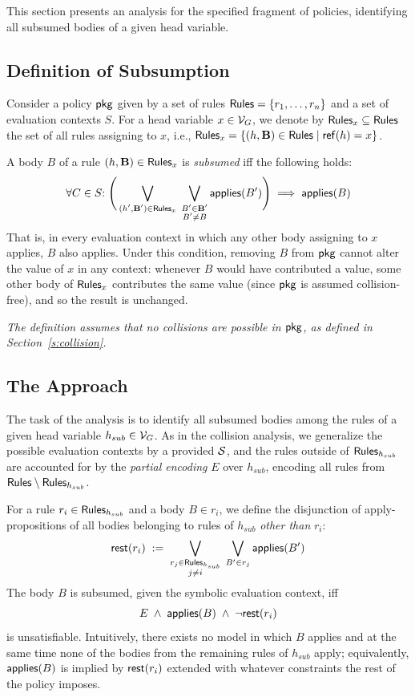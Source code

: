 This section presents an analysis for the specified fragment of \rego policies, identifying all subsumed bodies of a given head variable.

\subsection{Definition of Subsumption}

Consider a policy $\mathsf{pkg}$ given by a set of rules $\mathsf{Rules} = \{r_1,\ldots,r_n\}$ and a set of evaluation contexts $S$.
For a head variable $x \in \mathcal{V}_G$, we denote by $\mathsf{Rules}_x \subseteq \mathsf{Rules}$ the set of all rules assigning to $x$, i.e., $\mathsf{Rules}_x = \{(h,\mathbf{B}) \in \mathsf{Rules} \mid \mathsf{ref}(h) = x\}$.

A body $B$ of a rule $(h,\mathbf{B}) \in \mathsf{Rules}_x$ is \emph{subsumed} iff the following holds:
\begin{align*}
  \forall C \in S{:}\;
  \Bigg(\bigvee_{\substack{(h',\mathbf{B}') \in \mathsf{Rules}_x}}\;\bigvee_{\substack{B' \in \mathbf{B}' \\ B' \neq B}} \mathsf{applies}(B')\Bigg) \implies \mathsf{applies}(B)
\end{align*}
That is, in every evaluation context in which any other body assigning to $x$ applies, $B$ also applies.
Under this condition, removing $B$ from $\mathsf{pkg}$ cannot alter the value of $x$ in any context: whenever $B$ would have contributed a value, some other body of $\mathsf{Rules}_x$ contributes the same value (since $\mathsf{pkg}$ is assumed collision-free), and so the result is unchanged.

\textit{The definition assumes that no collisions are possible in $\mathsf{pkg}$, as defined in Section~\ref{s:collision}.}

\subsection{The Approach}

The task of the analysis is to identify all subsumed bodies among the rules of a given head variable $h_{sub} \in \mathcal{V}_G$.
As in the collision analysis, we generalize the possible evaluation contexts by a provided $\mathcal{S}$, and the rules outside of $\mathsf{Rules}_{h_{sub}}$ are accounted for by the \emph{partial encoding} $E$ over $h_{sub}$, encoding all rules from $\mathsf{Rules} \setminus \mathsf{Rules}_{h_{sub}}$.

For a rule $r_i \in \mathsf{Rules}_{h_{sub}}$ and a body $B \in r_i$, we define the disjunction of apply-propositions of all bodies belonging to rules of $h_{sub}$ \emph{other than} $r_i$:
$$\mathsf{rest}(r_i) \;\mathrel{:=}\; \bigvee_{\substack{r_j \in \mathsf{Rules}_{h_{sub}} \\ j \neq i}} \;\bigvee_{B' \in r_j} \mathsf{applies}(B')$$
The body $B$ is subsumed, given the symbolic evaluation context, iff
$$E \;\land\; \mathsf{applies}(B) \;\land\; \neg\mathsf{rest}(r_i)$$
is unsatisfiable.
Intuitively, there exists no model in which $B$ applies and at the same time none of the bodies from the remaining rules of $h_{sub}$ apply; equivalently, $\mathsf{applies}(B)$ is implied by $\mathsf{rest}(r_i)$ extended with whatever constraints the rest of the policy imposes.

